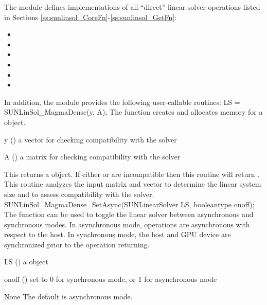The  module defines implementations of
all ``direct'' linear solver operations listed in
Sections \ref{ss:sunlinsol_CoreFn}-\ref{ss:sunlinsol_GetFn}:
\begin{itemize}
\item {}
\item {}
\item {}
\item {}
\item {}
\item {}
\end{itemize}
In addition, the module provides the following user-callable routines:
{
  LS = SUNLinSol\_MagmaDense(y, A);
}
{
  The function  creates and allocates memory for a
  {\sunlinsol} object.
}
{
  \begin{args}[A]
  \item[y] ()
    a vector for checking compatibility with the solver
  \item[A] ()
    a  matrix for checking compatibility with the solver
  \end{args}
}
{
  This returns a  object.  If either  or
   are incompatible then this routine will return .
}
{
  This routine analyzes the input matrix and vector to determine the
  linear system size and to assess compatibility with the solver.
}
{
  SUNLinSol\_MagmaDense\_SetAsync(SUNLinearSolver LS, booleantype onoff);
}
{
  The function  can be used to toggle the
  linear solver between asynchronous and synchronous modes. In asynchronous
  mode,  operations are asynchronous with respect to the
  host. In synchronous mode, the host and GPU device are synchronized prior to
  the operation returning.
}
{
  \begin{args}[onoff]
  \item[LS] ()
    a  object
  \item[onoff] ()
    set to 0 for synchronous mode, or 1 for asynchronous mode
  \end{args}
}
{ None }
{
  The default is asynchronous mode.
}

